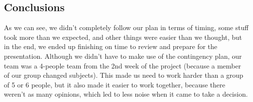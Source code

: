



 




\pagebreak
\subsection{Conclusions}
As we can see, we didn't completely follow our plan in terms of timing, some stuff took more than we expected, and other things were easier than we thought, but in the end, we ended up finishing on time to review and prepare for the presentation.
Although we didn't have to make use of the contingency plan, our team was a 4-people team from the 2nd week of the project (because a member of our group changed subjects). This made us need to work harder than a group of 5 or 6 people, but it also made it easier to work together, because there weren't as many opinions, which led to less noise when it came to take a decision.

